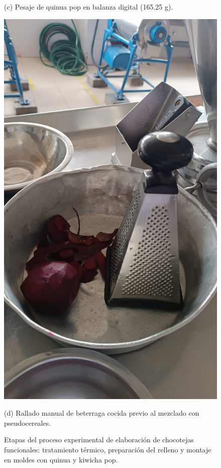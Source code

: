 \documentclass[manuscript,screen,review]{acmart}
\begin{document}
\begin{figure}[H]
\begin{minipage}{0.48\linewidth}
            
            \small (c) Pesaje de quinua pop en balanza digital (165.25 g).
          \end{minipage}
          \hspace{1em}
          \begin{minipage}{0.48\linewidth}
            \centering
            \includegraphics[width=0.9\linewidth]{imagen/rallado.jpeg}
            
            
            \small (d) Rallado manual de beterraga cocida previo al mezclado con pseudocereales.
          \end{minipage}
          
          \caption{Etapas del proceso experimental de elaboración de chocotejas funcionales: tratamiento térmico, preparación del relleno y montaje en moldes con quinua y kiwicha pop.}
          \label{fig:proceso_chocotejas}
        \end{figure}
\end{document}
